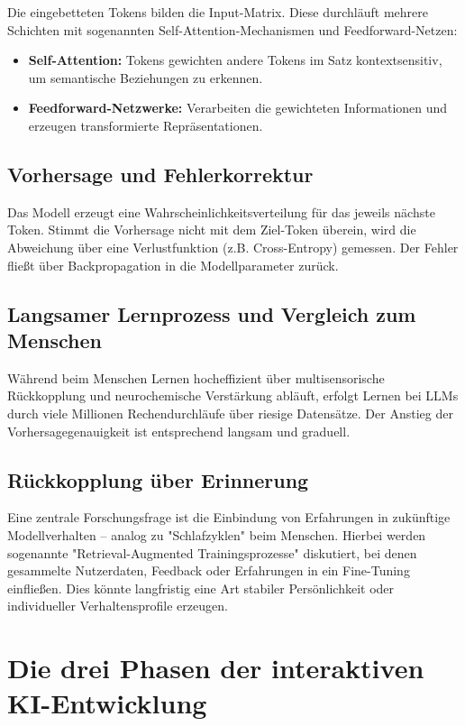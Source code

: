 Die eingebetteten Tokens bilden die Input-Matrix. Diese durchläuft mehrere Schichten mit sogenannten Self-Attention-Mechanismen und Feedforward-Netzen:
\begin{itemize}
    \item \textbf{Self-Attention:} Tokens gewichten andere Tokens im Satz kontextsensitiv, um semantische Beziehungen zu erkennen.
    \item \textbf{Feedforward-Netzwerke:} Verarbeiten die gewichteten Informationen und erzeugen transformierte Repräsentationen.
\end{itemize}

\subsection{Vorhersage und Fehlerkorrektur}

Das Modell erzeugt eine Wahrscheinlichkeitsverteilung für das jeweils nächste Token. Stimmt die Vorhersage nicht mit dem Ziel-Token überein, wird die Abweichung über eine Verlustfunktion (z.B. Cross-Entropy) gemessen. Der Fehler fließt über Backpropagation in die Modellparameter zurück.

\subsection{Langsamer Lernprozess und Vergleich zum Menschen}

Während beim Menschen Lernen hocheffizient über multisensorische Rückkopplung und neurochemische Verstärkung abläuft, erfolgt Lernen bei LLMs durch viele Millionen Rechendurchläufe über riesige Datensätze. Der Anstieg der Vorhersagegenauigkeit ist entsprechend langsam und graduell.

\subsection{Rückkopplung über Erinnerung}

Eine zentrale Forschungsfrage ist die Einbindung von Erfahrungen in zukünftige Modellverhalten -- analog zu "Schlafzyklen" beim Menschen. Hierbei werden sogenannte "Retrieval-Augmented Trainingsprozesse" diskutiert, bei denen gesammelte Nutzerdaten, Feedback oder Erfahrungen in ein Fine-Tuning einfließen. Dies könnte langfristig eine Art stabiler Persönlichkeit oder individueller Verhaltensprofile erzeugen.

\section{Die drei Phasen der interaktiven KI-Entwicklung}

